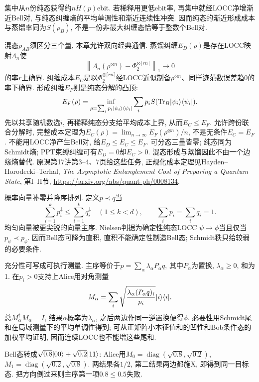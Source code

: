 集中从$n$份纯态获得约$nH(p)$ebit. 若稀释用更低ebit率, 再集中就经LOCC净增渐近Bell对, 与纯态纠缠熵的平均单调性和渐近连续性冲突. 因而纯态的渐近形成成本与蒸馏率同为$S(\rho_B)$, 不是一份非最大纠缠态恰等于整数个Bell对.

混态$\rho_{AB}$须区分三个量, 本章允许双向经典通信. 蒸馏纠缠$E_D(\rho)$是存在LOCC映射$\Lambda_n$使
\[\left\|\Lambda_n(\rho^{\otimes n})-
 \Phi_2^{\otimes\lfloor rn\rfloor}\right\|_1\longrightarrow0\]
的率$r$上确界. 纠缠成本$E_C$是以$\Phi_2^{\otimes\lceil rn\rceil}$经LOCC近似制备$\rho^{\otimes n}$、同样迹范数误差趋0的率下确界. 形成纠缠$E_F$则是纯态分解的凸顶:
\[E_F(\rho)=\inf_{\rho=\sum_ip_i\lvert \psi_i\rangle\langle \psi_i\rvert}
 \sum_ip_iS(\operatorname{Tr}_B\lvert \psi_i\rangle\langle \psi_i\rvert).\]
先以共享随机数选$i$, 再稀释纯态分支给平均成本上界, 从而$E_C\le E_F$. 允许跨份联合分解时, 完整成本定理为$E_C(\rho)=\lim_{n\to\infty}E_F(\rho^{\otimes n})/n$, 不是无条件$E_C=E_F$. 不能用LOCC净产生Bell对, 给$E_D\le E_C\le E_F$. 可分态三量皆零; 纯态同为Schmidt熵; PPT束缚纠缠可有$E_D=0$却$E_C>0$. 混态形成与蒸馏因此不由一个边缘熵替代. 原课第17讲第3--4、7页给这些任务, 正规化成本定理见Hayden--Horodecki--Terhal, \emph{The Asymptotic Entanglement Cost of Preparing a Quantum State}, 第I--II节, \url{https://arxiv.org/abs/quant-ph/0008134}.

概率向量补零并降序排列. 定义$p\prec q$当
\[\sum_{i=1}^kp_i^\downarrow\le\sum_{i=1}^kq_i^\downarrow
 \quad(1\le k<d),\qquad \sum_ip_i=\sum_iq_i=1.\]
均匀向量被更尖锐的向量主序. Nielsen判据为确定性纯态LOCC $\psi\to\phi$当且仅当$p_\psi\prec p_\phi$. 因而Bell态可降为直积, 直积不能确定性制造Bell态; Schmidt秩只给较弱的必要条件.

充分性可写成可执行测量. 主序等价于$p=\sum_\alpha\lambda_\alpha P_\alpha q$, 其中$P_\alpha$为置换, $\lambda_\alpha\ge0$, 和为1. 在$p_i>0$支持上Alice用对角测量
\[M_\alpha=\sum_i\sqrt{\frac{\lambda_\alpha(P_\alpha q)_i}{p_i}}\lvert i\rangle\langle i\rvert.\]
总$M_\alpha^\dagger M_\alpha=I$, 结果$\alpha$概率为$\lambda_\alpha$, 之后两边作同一逆置换便得$\phi$. 必要性用Schmidt尾和在局域测量下的平均单调性得到; 可从正矩阵小本征值和的凹性和Bob条件态的加权平均证明, 因而连续LOCC也不能增这些尾和.
\begin{example}Bell态转成$\sqrt{0.8}\lvert 00\rangle+\sqrt{0.2}\lvert 11\rangle$: Alice用$M_0=\operatorname{diag}(\sqrt{0.8},\sqrt{0.2})$, $M_1=\operatorname{diag}(\sqrt{0.2},\sqrt{0.8})$. 两结果各$1/2$, 第二结果两边都施X, 即得到同一目标态. 把方向倒过来则主序第一项$0.8\le0.5$失败.\end{example}
